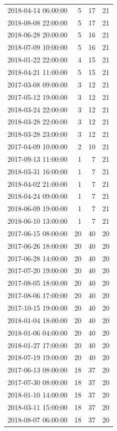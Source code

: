 \begin{tabular}{lrrr}
2018-04-14 06:00:00 & 5 & 17 & 21 \\
2018-08-08 22:00:00 & 5 & 17 & 21 \\
2018-06-28 20:00:00 & 5 & 16 & 21 \\
2018-07-09 10:00:00 & 5 & 16 & 21 \\
2018-01-22 22:00:00 & 4 & 15 & 21 \\
2018-04-21 11:00:00 & 5 & 15 & 21 \\
2017-03-08 09:00:00 & 3 & 12 & 21 \\
2017-05-12 19:00:00 & 3 & 12 & 21 \\
2018-03-24 22:00:00 & 3 & 12 & 21 \\
2018-03-28 22:00:00 & 3 & 12 & 21 \\
2018-03-28 23:00:00 & 3 & 12 & 21 \\
2017-04-09 10:00:00 & 2 & 10 & 21 \\
2017-09-13 11:00:00 & 1 & 7 & 21 \\
2018-03-31 16:00:00 & 1 & 7 & 21 \\
2018-04-02 21:00:00 & 1 & 7 & 21 \\
2018-04-24 09:00:00 & 1 & 7 & 21 \\
2018-06-09 19:00:00 & 1 & 7 & 21 \\
2018-06-10 13:00:00 & 1 & 7 & 21 \\
2017-06-15 08:00:00 & 20 & 40 & 20 \\
2017-06-26 18:00:00 & 20 & 40 & 20 \\
2017-06-28 14:00:00 & 20 & 40 & 20 \\
2017-07-20 19:00:00 & 20 & 40 & 20 \\
2017-08-05 18:00:00 & 20 & 40 & 20 \\
2017-08-06 17:00:00 & 20 & 40 & 20 \\
2017-10-15 19:00:00 & 20 & 40 & 20 \\
2018-01-04 18:00:00 & 20 & 40 & 20 \\
2018-01-06 04:00:00 & 20 & 40 & 20 \\
2018-01-27 17:00:00 & 20 & 40 & 20 \\
2018-07-19 19:00:00 & 20 & 40 & 20 \\
2017-06-13 08:00:00 & 18 & 37 & 20 \\
2017-07-30 08:00:00 & 18 & 37 & 20 \\
2018-01-10 14:00:00 & 18 & 37 & 20 \\
2018-03-11 15:00:00 & 18 & 37 & 20 \\
2018-08-07 06:00:00 & 18 & 37 & 20 \\

\end{tabular}
